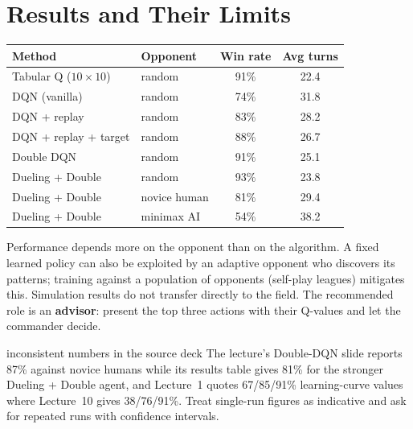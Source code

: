 \documentclass[11pt]{article}
\begin{document}
\section{Results and Their Limits}
\begin{center}\small\renewcommand{\arraystretch}{1.2}
\begin{tabular}{llcc}\toprule Method & Opponent & Win rate & Avg turns\\\midrule Tabular Q ($10\times10$) & random & 91\% & 22.4\\ DQN (vanilla) & random & 74\% & 31.8\\ DQN + replay & random & 83\% & 28.2\\ DQN + replay + target & random & 88\% & 26.7\\ Double DQN & random & 91\% & 25.1\\ Dueling + Double & random & 93\% & 23.8\\ Dueling + Double & novice human & 81\% & 29.4\\ Dueling + Double & minimax AI & 54\% & 38.2\\\bottomrule\end{tabular}\end{center}
Performance depends more on the opponent than on the algorithm. A fixed learned policy can also be exploited by an adaptive opponent who discovers its patterns; training against a population of opponents (self-play leagues) mitigates this. Simulation results do not transfer directly to the field. The recommended role is an \textbf{advisor}: present the top three actions with their Q-values and let the commander decide.
\begin{pitfall}{inconsistent numbers in the source deck}
The lecture's Double-DQN slide reports 87\% against novice humans while its results table gives 81\% for the stronger Dueling + Double agent, and Lecture~1 quotes 67/85/91\% learning-curve values where Lecture~10 gives 38/76/91\%. Treat single-run figures as indicative and ask for repeated runs with confidence intervals.
\end{pitfall}
\end{document}
